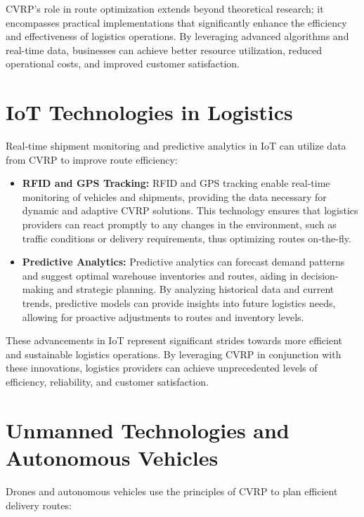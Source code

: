 \documentclass[
]{article}
\begin{document}
    CVRP's role in route optimization extends beyond theoretical research; it encompasses practical implementations that significantly enhance the efficiency and effectiveness of logistics operations. By leveraging advanced algorithms and real-time data, businesses can achieve better resource utilization, reduced operational costs, and improved customer satisfaction.


    \section{IoT Technologies in Logistics}\label{sec:iot-technologies-in-logistics}

    Real-time shipment monitoring and predictive analytics in IoT can utilize data from CVRP to improve route efficiency:

    \begin{itemize}
        \item \textbf{RFID and GPS Tracking:} RFID and GPS tracking enable real-time monitoring of vehicles and shipments, providing the data necessary for dynamic and adaptive CVRP solutions. This technology ensures that logistics providers can react promptly to any changes in the environment, such as traffic conditions or delivery requirements, thus optimizing routes on-the-fly.
        \item \textbf{Predictive Analytics:} Predictive analytics can forecast demand patterns and suggest optimal warehouse inventories and routes, aiding in decision-making and strategic planning. By analyzing historical data and current trends, predictive models can provide insights into future logistics needs, allowing for proactive adjustments to routes and inventory levels.
    \end{itemize}

    These advancements in IoT represent significant strides towards more efficient and sustainable logistics operations. By leveraging CVRP in conjunction with these innovations, logistics providers can achieve unprecedented levels of efficiency, reliability, and customer satisfaction.


    \section{Unmanned Technologies and Autonomous Vehicles}\label{sec:unmanned-technologies-and-autonomous-vehicles}

    Drones and autonomous vehicles use the principles of CVRP to plan efficient delivery routes:
\end{document}
